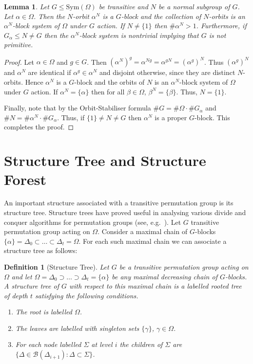 \documentclass[11pt]{madras}%
\newtheorem{lemma}[theorem]{Lemma}
\newtheorem{definition}[theorem]{Definition}
\theoremstyle{remark}
\newcommand{\Sym}[1]{{\ensuremath{\mathrm{Sym}\left(#1\right)}}}
\newcommand{\Blocks}[1]{{\ensuremath{\mathcal{B}\left(#1\right)}}}
\begin{document}
\begin{lemma}\label{lem-orbit-normal}
  Let $G\leq\Sym{\Omega}$ be transitive and $N$ be a normal subgroup
  of $G$. Let $\alpha\in\Omega$. Then the $N$-orbit $\alpha^N$ is a
  $G$-block and the collection of $N$-orbits is an $\alpha^N$-block
  system of $\Omega$ under $G$ action. If $N\neq\{ 1 \}$ then
  $\# \alpha^N > 1$. Furthermore, if $G_\alpha\leq N\neq G$ then the
  $\alpha^N$-block system is nontrivial implying that $G$ is not
  primitive.
\end{lemma}
\begin{proof}
  Let $\alpha\in\Omega$ and $g \in G$. Then $(\alpha^N)^g =
  \alpha^{Ng} = \alpha^{gN} = (\alpha^g)^N$. Thus $(\alpha^g)^N$ and
  $\alpha^N$ are identical if $\alpha^g\in\alpha^N$ and disjoint
  otherwise, since they are distinct $N$-orbits. Hence $\alpha^N$ is a
  $G$-block and the orbits of $N$ is an $\alpha^N$-block system of
  $\Omega$ under $G$ action. If $\alpha^N = \{ \alpha \}$ then for all
  $\beta \in \Omega$, $\beta^N = \{ \beta \}$. Thus, $N=\{1\}$.

  Finally, note that by the Orbit-Stabiliser formula $\#
  G=\#\Omega\cdot\# G_\alpha$ and $\# N=\#\alpha^N\cdot\# G_\alpha$.
  Thus, if $\{1\}\neq N\neq G$ then $\alpha^N$ is a proper $G$-block.
  This completes the proof.
\end{proof}

\section{Structure Tree and Structure
  Forest}\label{sect-structure-tree}
An important structure associated with a transitive permutation group
is its structure tree.  Structure trees have proved useful in
analysing various divide and conquer algorithms for permutation groups
(see, e.g.\ \cite{luks93permutation}). Let $G$ transitive permutation
group acting on $\Omega$. Consider a maximal chain of $G$-blocks $\{
\alpha \} = \Delta_0 \subset \ldots \subset \Delta_t = \Omega$. For
each such maximal chain we can associate a structure tree as follows:

\begin{definition}[Structure Tree]
  Let $G$ be a transitive permutation group acting on $\Omega$ and let
  $\Omega = \Delta_0 \supset \ldots \supset \Delta_t = \{ \alpha \}$
  be any maximal decreasing chain of $G$-blocks. A structure tree of
  $G$ with respect to this maximal chain is a labelled rooted tree of
  depth $t$ satisfying the following conditions.
  \begin{enumerate}
  \item The root is labelled $\Omega$.
  \item The leaves are labelled with singleton sets $\{ \gamma \}$,
    $\gamma \in \Omega$.
  \item For each node labelled $\Sigma$ at level $i$ the children of
    $\Sigma$ are $\{ \Delta \in \Blocks{\Delta_{i+1}} : \Delta \subset
    \Sigma \}$.
  \end{enumerate}
\end{definition}
\end{document}
